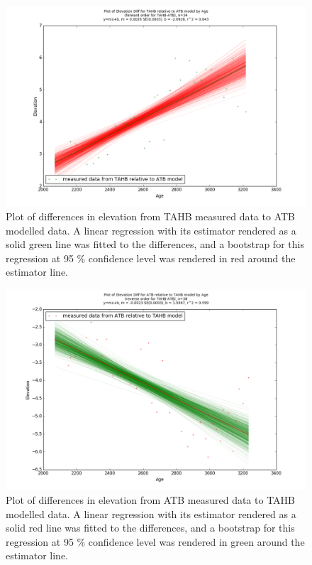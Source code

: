 \newpage

\begin{figure}[H]
	\includegraphics[width=1.3\linewidth, angle=270 ]{data/bothNonZero/withinSeventyFivePercent/gias/theGIA_TAHB_relative_to_ATB.png}
	\caption{Plot of differences in elevation from TAHB measured data to ATB modelled data. A linear regression with its estimator rendered as
	 a solid green line was fitted to the differences, and a bootstrap for this regression at 95 \% confidence level was rendered in red
	 around the estimator line.}
	\label{fig:gias_TAHBxATB}
\end{figure}
\newpage


\begin{figure}[H]
	\includegraphics[width=1.3\linewidth, angle=270 ]{data/bothNonZero/withinSeventyFivePercent/gias/theGIA_ATB_relative_to_TAHB.png}
	\caption{Plot of differences in elevation from ATB measured data to TAHB modelled data. A linear regression with its estimator rendered as
	 a solid red line was fitted to the differences, and a bootstrap for this regression at 95 \% confidence level was rendered in green
	 around the estimator line.}
	\label{fig:gias_ATBxTAHB}
\end{figure}
\newpage




